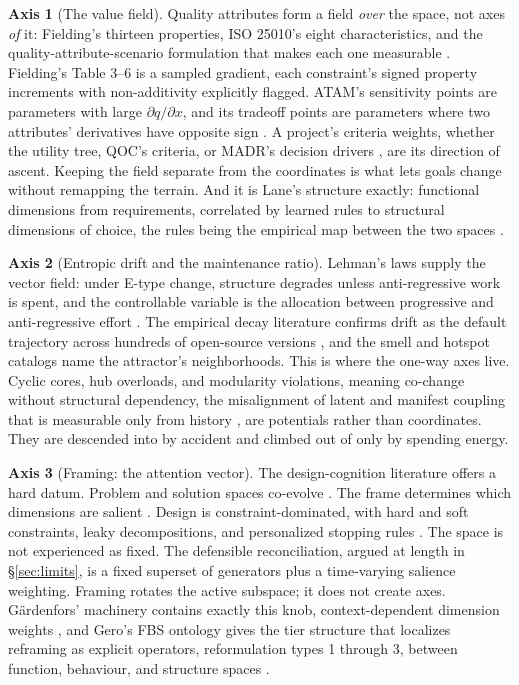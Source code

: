 \documentclass[11pt,oneside]{article}
\theoremstyle{definition}
\newtheorem{axis}{Axis}
\begin{document}
\begin{axis}[The value field]\label{ax:value}
Quality attributes form a field \emph{over} the space, not axes \emph{of} it: Fielding's
thirteen properties, ISO 25010's eight characteristics, and the quality-attribute-scenario
formulation that makes each one measurable \cite{fielding2000,iso25010,bass2012}. Fielding's
Table 3--6 is a sampled gradient, each constraint's signed property increments with
non-additivity explicitly flagged. ATAM's sensitivity points are parameters with large
$\partial q / \partial x$, and its tradeoff points are parameters where two attributes'
derivatives have opposite sign \cite{atam2000}. A project's criteria weights, whether the
utility tree, QOC's criteria, or MADR's decision drivers \cite{madr2018}, are its direction of
ascent. Keeping the field separate from the coordinates is what lets goals change without
remapping the terrain. And it is Lane's structure exactly: functional dimensions from
requirements, correlated by learned rules to structural dimensions of choice, the rules being
the empirical map between the two spaces \cite{lane1990}.
\end{axis}

\begin{axis}[Entropic drift and the maintenance ratio]\label{ax:drift}
Lehman's laws supply the vector field: under E-type change, structure degrades unless
anti-regressive work is spent, and the controllable variable is the allocation between
progressive and anti-regressive effort \cite{lehman1980}. The empirical decay literature
confirms drift as the default trajectory across hundreds of open-source versions
\cite{behnamghader2017}, and the smell and hotspot catalogs \cite{azadi2019,mo2016} name the
attractor's neighborhoods. This is where the one-way axes live. Cyclic cores, hub overloads,
and modularity violations, meaning co-change without structural dependency, the misalignment of
latent and manifest coupling that is measurable only from history \cite{mo2016}, are potentials
rather than coordinates. They are descended into by accident and climbed out of only by
spending energy.
\end{axis}

\begin{axis}[Framing: the attention vector]\label{ax:framing}
The design-cognition literature offers a hard datum. Problem and solution spaces co-evolve
\cite{dorstcross2001}. The frame determines which dimensions are salient \cite{schon1983}.
Design is constraint-dominated, with hard and soft constraints, leaky decompositions, and
personalized stopping rules \cite{goelpirolli1992}. The space is not experienced as fixed. The
defensible reconciliation, argued at length in \S\ref{sec:limits}, is a fixed superset of
generators plus a time-varying salience weighting. Framing rotates the active subspace; it does
not create axes. G\"ardenfors' machinery contains exactly this knob, context-dependent dimension
weights \cite{gardenfors2000}, and Gero's FBS ontology gives the tier structure that localizes
reframing as explicit operators, reformulation types 1 through 3, between function, behaviour,
and structure spaces \cite{gero2004}.
\end{axis}
\end{document}
